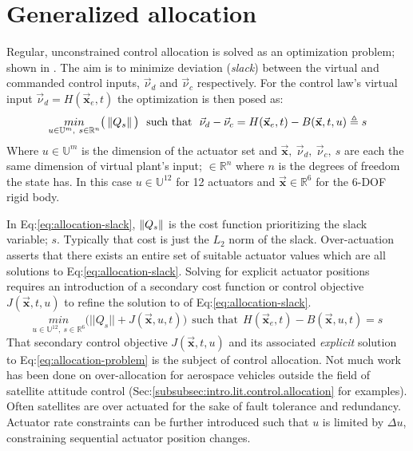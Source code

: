 \section{Generalized allocation}
\label{sec:allocation.slack}
Regular, unconstrained control allocation is solved as an optimization problem; shown in \cite{allocation,controlallocation}. The aim is to minimize deviation (\emph{slack}) between the virtual and commanded control inputs, $\vec{\nu}_d$ and $\vec{\nu}_c$ respectively. For the control law's virtual input $\vec{\nu}_d=H(\vec{\mathbf{x}}_e,t)$ the optimization is then posed as:
\begin{equation}\label{eq:allocation-slack}
\underset{u\in\mathbb{U}^{m},~s\in\mathbb{R}^{n}}{min}\big(\left\lVert Q_s\right\rVert\big)~~\text{such that}~~\vec{\nu}_d-\vec{\nu}_c=H(\vec{\mathbf{x}}_e,t)-B(\vec{\mathbf{x}},t,u)\triangleq s
\end{equation}
Where $u\in\mathbb{U}^m$ is the dimension of the actuator set and $\vec{\mathbf{x}},~\vec{\nu}_d,~\vec{\nu}_c,~s$ are each the same dimension of virtual plant's input; $\in\mathbb{R}^{n}$ where $n$ is the degrees of freedom the state has. In this case $u\in\mathbb{U}^{12}$ for 12 actuators and $\vec{\mathbf{x}}\in\mathbb{R}^6$ for the 6-DOF rigid body.
\par
In Eq:\ref{eq:allocation-slack}, $\left\lVert Q_s\right\rVert$ is the cost function prioritizing the slack variable; $s$. Typically that cost is just the $L_2$ norm of the slack. Over-actuation asserts that there exists an entire set of suitable actuator values which are all solutions to Eq:\ref{eq:allocation-slack}. Solving for explicit actuator positions requires an introduction of a secondary cost function or control objective $J(\vec{\mathbf{x}},t,u)$ to refine the solution to of Eq:\ref{eq:allocation-slack}.
\begin{equation}\label{eq:allocation-problem}
\underset{u\in\mathbb{U}^{12},~s\in\mathbb{R}^{6}}{min}\big(||Q_s||+J(\vec{\mathbf{x}},u,t)\big)~~\text{such that}~~H(\vec{\mathbf{x}}_e,t)-B(\vec{\mathbf{x}},u,t)=s
\end{equation}
That secondary control objective $J(\vec{\mathbf{x}},t,u)$ and its associated \emph{explicit} solution to Eq:\ref{eq:allocation-problem} is the subject of control allocation. Not much work has been done on over-allocation for aerospace vehicles outside the field of satellite attitude control (Sec:\ref{subsubsec:intro.lit.control.allocation} for examples). Often satellites are over actuated for the sake of fault tolerance and redundancy\cite{FTCallocation,discreteFTC}. Actuator rate constraints can be further introduced such that $u$ is limited by $\Delta u$, constraining sequential actuator position changes.
